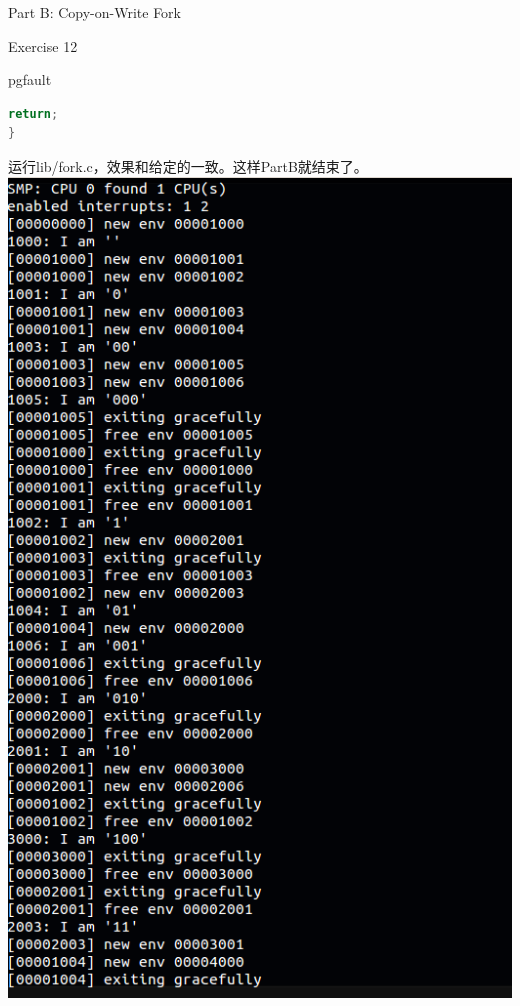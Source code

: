 \documentclass[GBK,winfonts,a4paper,10pt]{ctexart}
\begin{document}
\begin{section}{Part B: Copy-on-Write Fork}
\begin{subsection}{ Exercise 12 }
\begin{subsubsection}{ pgfault }
\begin{lstlisting}[language = C]
	return;
}
\end{lstlisting}
\end{subsubsection}
\par
运行lib/fork.c，效果和给定的一致。这样PartB就结束了。
\includegraphics[scale=0.5]{pic3.png}
\end{subsection}
\end{section}
\end{document}
